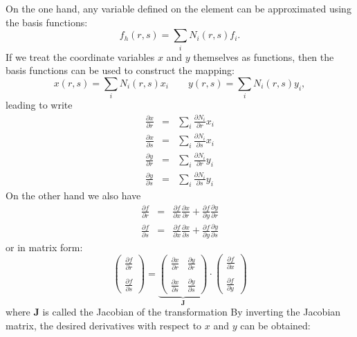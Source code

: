 On the one hand, any variable defined on the element can be approximated using the basis functions:
\begin{equation}
f_h(r,s)=\sum_i N_i(r,s) f_i.
\end{equation}
If we treat the coordinate variables $x$ and $y$ themselves as functions, 
then the basis functions can be used to construct the mapping:
\begin{equation}
x(r,s)=\sum_i N_i(r,s) x_i 
\qquad
y(r,s)=\sum_i N_i(r,s) y_i,  \label{eqxy}
\end{equation}
leading to write
\begin{eqnarray}
\frac{\partial x}{\partial r} &=& \sum_i \frac{\partial N_i}{\partial r} x_i \\
\frac{\partial x}{\partial s} &=& \sum_i \frac{\partial N_i}{\partial s} x_i \\
\frac{\partial y}{\partial r} &=& \sum_i \frac{\partial N_i}{\partial r} y_i \\
\frac{\partial y}{\partial s} &=& \sum_i \frac{\partial N_i}{\partial s} y_i 
\end{eqnarray}
On the other hand we also have 
\begin{eqnarray}
\frac{\partial f}{\partial r} &=&
\frac{\partial f}{\partial x}\frac{\partial x}{\partial r}
+\frac{\partial f}{\partial y}\frac{\partial y}{\partial r} \\
\frac{\partial f}{\partial s} &=&
\frac{\partial f}{\partial x}\frac{\partial x}{\partial s}
+\frac{\partial f}{\partial y}\frac{\partial y}{\partial s}
\end{eqnarray}
or in matrix form:
\begin{equation}
\left(
\begin{array}{c}
\frac{\partial f}{\partial r} \\ \\
\frac{\partial f}{\partial s}
\end{array}
\right)
=
\underbrace{
\left(
\begin{array}{cc}
\frac{\partial x}{\partial r} & \frac{\partial y}{\partial r} \nonumber\\ \\
\frac{\partial x}{\partial s} & \frac{\partial y}{\partial s} \nonumber
\end{array}
\right)
}_{\bm J}
\cdot
\left(
\begin{array}{c}
\frac{\partial f}{\partial x} \\ \\
\frac{\partial f}{\partial y}
\end{array}
\right)
\end{equation}
where ${\bm J}$ is called the Jacobian of the transformation
By inverting the Jacobian matrix, the desired derivatives with respect to $x$
and $y$ can be obtained:

